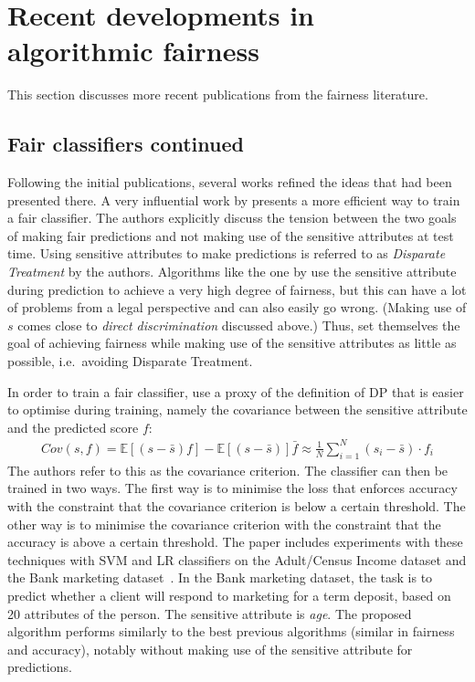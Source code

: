 \section{Recent developments in algorithmic fairness}%
\label{sec:refinement-on-previous-ideas-for-fair-classification-and-fair-representations}
This section discusses more recent publications from the fairness literature.

\subsection{Fair classifiers continued}
Following the initial publications,
several works refined the ideas that had been presented there.
A very influential work by \citet{zafar2017fairnessconstraints}
presents a more efficient way to train a fair classifier.
The authors explicitly discuss the tension
between the two goals of making fair predictions and not making use of the sensitive attributes at test time.
Using sensitive attributes to make predictions
is referred to as \emph{Disparate Treatment} by the authors.
Algorithms like the one by \citet{calders2009building} use the sensitive
attribute during prediction to achieve a very high degree of fairness, but this can have a
lot of problems from a legal perspective and can also easily go wrong.
(Making use of \(s\) comes close to \emph{direct discrimination} discussed above.)
Thus, \citet{zafar2017fairnessconstraints} set themselves the goal of achieving fairness while making use of the sensitive attributes
as little as possible, i.e.~avoiding Disparate Treatment.

In order to train a fair classifier, \citet{zafar2017fairnessconstraints} use a proxy of the definition of
\ac{DP} that is easier to optimise during training, namely the covariance
between the sensitive attribute and the predicted score \(f\):
\begin{align}
  \label{eq:zafar-constraint}
  Cov(s, f) = \mathbb{E}[(s - \bar{s})f] - \mathbb{E}[(s - \bar{s})]\bar{f} \approx 
  \frac{1}{N} \sum\limits_{i=1}^{N} (s_i - \bar{s}) \cdot f_i
\end{align}
The authors refer to this as the covariance criterion.
The classifier can then be trained in two ways.
The first way is to minimise the loss that enforces accuracy
with the constraint that the covariance criterion is below a certain threshold.
The other way is to minimise the covariance criterion
with the constraint that the accuracy is above a certain threshold.
The paper includes experiments with these techniques with \ac{SVM} and \acf{LR} classifiers
on the Adult/Census Income dataset and the Bank marketing dataset~\citep{Dua:2017}.
In the Bank marketing dataset, the task is to predict whether a client will respond to marketing for a term deposit,
based on 20 attributes of the person.
The sensitive attribute is \emph{age}.
The proposed algorithm performs similarly to the best previous algorithms (similar in fairness and accuracy),
notably without making use of the sensitive attribute for predictions.

